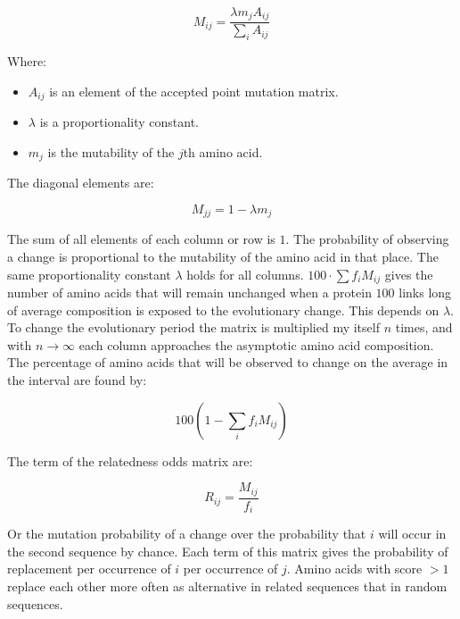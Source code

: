 $$M_{ij} = \frac{\lambda m_jA_{ij}}{\sum\limits_iA_{ij}}$$

Where:

\begin{multicols}{2}
	\begin{itemize}
		\item $A_{ij}$ is an element of the accepted point mutation matrix.
		\item $\lambda$ is a proportionality constant.
		\item $m_j$ is the mutability of the $j$th amino acid.
	\end{itemize}
\end{multicols}

The diagonal elements are:

$$M_{jj} = 1-\lambda m_j$$

The sum of all elements of each column or row is $1$.
The probability of observing a change is proportional to the mutability of the amino acid in that place.
The same proportionality constant $\lambda$ holds for all columns.
$100\cdot\sum f_iM_{ij}$ gives the number of amino acids that will remain unchanged when a protein $100$ links long of average composition is exposed to the evolutionary change.
This depends on $\lambda$.
To change the evolutionary period the matrix is multiplied my itself $n$ times, and with $n \rightarrow \infty$ each column approaches the asymptotic amino acid composition.
The percentage of amino acids that will be observed to change on the average in the interval are found by:

$$100(1-\sum\limits_if_iM_{ij})$$

The term of the relatedness odds matrix are:

$$R_{ij} = \frac{M_{ij}}{f_i}$$

Or the mutation probability of a change over the probability that $i$ will occur in the second sequence by chance.
Each term of this matrix gives the probability of replacement per occurrence of $i$ per occurrence of $j$.
Amino acids with score $>1$ replace each other more often as alternative in related sequences that in random sequences.
